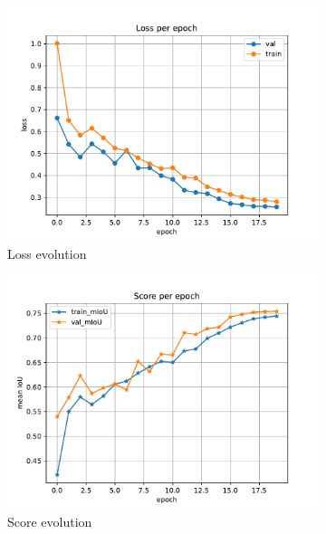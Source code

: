 \documentclass[10pt, a4paper]{article}
\begin{document}
\begin{figure}[htpb]
  \centering
  \begin{subfigure}[b]{0.32\textwidth}
      \centering
      \includegraphics[width=\textwidth]{images/Patch64_imagenet_loss.pdf}
      \caption{Loss evolution}
      \label{fig:q1b_loss}
  \end{subfigure}
  \hfill
  \begin{subfigure}[b]{0.32\textwidth}
    \centering
    \includegraphics[width=\textwidth]{images/Patch64_imagenet_score.pdf}
    \caption{Score evolution}
    \label{fig:q1b_score}
  \end{subfigure}
  \hfill
  \begin{subfigure}[b]{0.32\textwidth}

\end{subfigure}
\end{figure}
\end{document}
